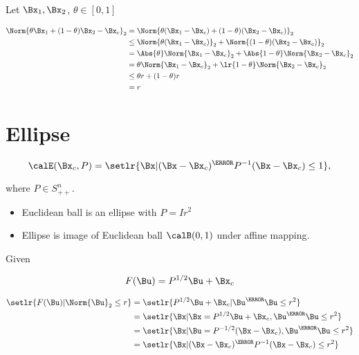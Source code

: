 Let \( \Bx_1, \Bx_2 \), \(\theta \in [0,1]\)

\begin{dmath}\label{eqn:convexOptimizationLecture4:200}
\begin{aligned}
\Norm{ \theta \Bx_1 + (1-\theta) \Bx_2 - \Bx_c }_2
&=
\Norm{ \theta (\Bx_1 - \Bx_c) + (1-\theta) (\Bx_2 - \Bx_c) }_2 \\
&\le
\Norm{ \theta (\Bx_1 - \Bx_c)}_2 + \Norm{(1-\theta) (\Bx_2 - \Bx_c) }_2 \\
&=
\Abs{\theta} \Norm{ \Bx_1 - \Bx_c}_2 + \Abs{1 -\theta} \Norm{ \Bx_2 - \Bx_c }_2 \\
&=
\theta \Norm{ \Bx_1 - \Bx_c}_2 + \lr{1 -\theta} \Norm{ \Bx_2 - \Bx_c }_2 \\
&\le
\theta r + (1 - \theta) r \\
&= r
\end{aligned}
\end{dmath}

\section{Ellipse}

\begin{equation}\label{eqn:convexOptimizationLecture4:220}
\calE(\Bx_c, P)
=
\setlr{ \Bx | (\Bx - \Bx_c)^\T P^{-1} (\Bx - \Bx_c) \le 1 },
\end{equation}

where \( P \in S^n_{++} \).

\begin{itemize}
\item Euclidean ball is an ellipse with \( P = I r^2 \)
\item Ellipse is image of Euclidean ball \( \calB(0,1) \) under affine mapping.
\end{itemize}


Given

\begin{dmath}\label{eqn:convexOptimizationLecture4:240}
F(\Bu) = P^{1/2} \Bu + \Bx_c
\end{dmath}

\begin{dmath}\label{eqn:convexOptimizationLecture4:260}
\begin{aligned}
\setlr{ F(\Bu) | \Norm{\Bu}_2 \le r }
&=
\setlr{ P^{1/2} \Bu + \Bx_c | \Bu^\T \Bu \le r^2 } \\
&=
\setlr{ \Bx | \Bx = P^{1/2} \Bu + \Bx_c, \Bu^\T \Bu \le r^2 } \\
&=
\setlr{ \Bx | \Bu = P^{-1/2} (\Bx - \Bx_c), \Bu^\T \Bu \le r^2 } \\
&=
\setlr{ \Bx | (\Bx - \Bx_c)^\T P^{-1} (\Bx - \Bx_c) \le r^2 }
\end{aligned}
\end{dmath}

